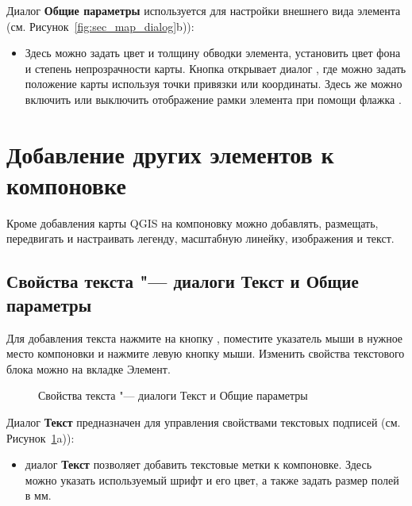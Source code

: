 
Диалог \textbf{Общие параметры} используется для настройки внешнего
вида элемента (см. Рисунок~\ref{fig:sec_map_dialog}b)):

\begin{itemize}[label=--]
\item Здесь можно задать цвет и толщину обводки элемента, установить цвет
фона и степень непрозрачности карты. Кнопка  открывает
диалог , где можно задать положение карты
используя точки привязки или координаты. Здесь же можно включить или
выключить отображение рамки элемента при помощи флажка
.
\end{itemize}

\section{Добавление других элементов к компоновке}

Кроме добавления карты QGIS на компоновку можно добавлять, размещать,
передвигать и настраивать легенду, масштабную линейку, изображения и
текст.

\subsection{Свойства текста "--- диалоги Текст и Общие параметры}

Для добавления текста нажмите на кнопку
, поместите указатель мыши в
нужное место компоновки и нажмите левую кнопку мыши. Изменить свойства
текстового блока можно на вкладке Элемент.

\begin{figure}[ht]
\centering
   \hspace{1cm}
   \caption{Свойства текста "--- диалоги Текст и Общие параметры \nixcaption}\label{fig:label_option}
\end{figure}


Диалог \textbf{Текст} предназначен для управления свойствами текстовых
подписей (см. Рисунок~\ref{fig:label_option}a)):

\begin{itemize}[label=--]
\item диалог \textbf{Текст} позволяет добавить текстовые метки к
компоновке. Здесь можно указать используемый шрифт и его цвет, а также
задать размер полей в мм.
\end{itemize}

